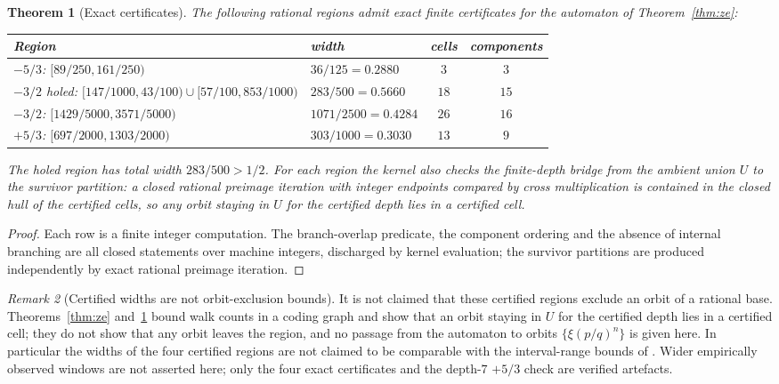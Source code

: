\documentclass[11pt,a4paper]{article}
\newtheorem{theorem}{Theorem}[section]
\theoremstyle{remark}
\newtheorem{remark}[theorem]{Remark}
\begin{document}
\begin{theorem}[Exact certificates]
\label{thm:certs}
The following rational regions admit exact finite certificates for the automaton of Theorem~\ref{thm:ze}:
\begin{center}
\footnotesize
\begin{tabular}{@{}L{0.48\textwidth}L{0.24\textwidth}cc@{}}
\toprule
Region & width & cells & components \\
\midrule
$-5/3$: $[89/250,161/250)$ & $36/125 = 0.2880$ & $3$ & $3$ \\
$-3/2$ holed: $[147/1000,43/100)\allowbreak\cup[57/100,853/1000)$ & $283/500 = 0.5660$ & $18$ & $15$ \\
$-3/2$: $[1429/5000,3571/5000)$ & $1071/2500 = 0.4284$ & $26$ & $16$ \\
$+5/3$: $[697/2000,1303/2000)$ & $303/1000 = 0.3030$ & $13$ & $9$ \\
\bottomrule
\end{tabular}
\end{center}
The holed region has total width $283/500 > 1/2$. For each region the kernel also checks the finite-depth bridge from the ambient union $U$ to the survivor partition: a closed rational preimage iteration with integer endpoints compared by cross multiplication is contained in the closed hull of the certified cells, so any orbit staying in $U$ for the certified depth lies in a certified cell.
\end{theorem}

\begin{proof}
Each row is a finite integer computation. The branch-overlap predicate, the component ordering and the absence of internal branching are all closed statements over machine integers, discharged by kernel evaluation; the survivor partitions are produced independently by exact rational preimage iteration.
\end{proof}

\begin{remark}[Certified widths are not orbit-exclusion bounds]
\label{rem:certwidths}
It is not claimed that these certified regions exclude an orbit of a rational base. Theorems~\ref{thm:ze} and~\ref{thm:certs} bound walk counts in a coding graph and show that an orbit staying in $U$ for the certified depth lies in a certified cell; they do not show that any orbit leaves the region, and no passage from the automaton to orbits $\{\xi(p/q)^{n}\}$ is given here. In particular the widths of the four certified regions are not claimed to be comparable with the interval-range bounds of \citep{flp1995,luzheng2026}. Wider empirically observed windows are not asserted here; only the four exact certificates and the depth-$7$ $+5/3$ check are verified artefacts.
\end{remark}
\end{document}
